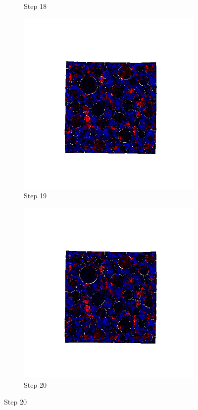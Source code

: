 \begin{figure}[ht!]
\begin{subfigure}{.25\textwidth}
      \caption{Step 18}
      \end{subfigure}%
      \begin{subfigure}{.25\textwidth}
        \centering
        \includegraphics[width=1.0\linewidth]{Files/A30P75_3_IS/DEP50-STEP(019).png}
      \caption{Step 19}
      \end{subfigure}%
      \begin{subfigure}{.25\textwidth}
        \centering
        \includegraphics[width=1.0\linewidth]{Files/A30P75_3_IS/DEP50-STEP(020).png}
      \caption{Step 20}
      \end{subfigure}


\end{figure}
